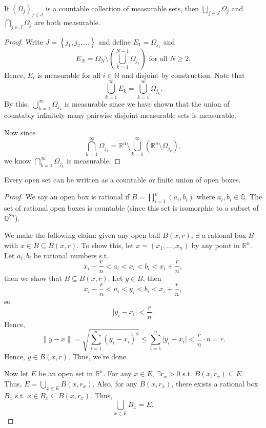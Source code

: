 \begin{lemma} \label{lm: sigma algebra property}
    If \((\Omega _j)_{j \in J}\) is a countable collection of measurable sets, then \(\bigcup_{j \in J} \Omega _j \) and \(\bigcap_{j \in J} \Omega _j \) are both measurable.   
\end{lemma}

\begin{proof}
    Write \(J = \left\{ j_1, j_2, \dots  \right\} \) and define \(E_1 = \Omega _{j_1}\) and
    \[
        E_N = \Omega _N \setminus \left( \bigcup_{k=1}^{N-1} \Omega _{j_k}  \right) \text{ for all } N \ge 2.  
    \]   
    Hence, \(E_i\) is measurable for all \(i \in \mathbb{N}\) and disjoint by construction. Note that 
    \[
        \bigcup_{k=1}^{\infty} E_k = \bigcup_{k=1}^{\infty} \Omega _{j_k}.  
    \]  
    By this, \(\bigcup_{k=1}^{\infty} \Omega _{j_k}\) is measurable since we have shown that the union of countably infinitely many pairwise disjoint measurable sets is measurable. 

    Now since 
    \[
        \bigcap_{k=1}^{\infty} \Omega _{j_k} = \mathbb{R} ^n \setminus \bigcup_{k=1}^{\infty} (\mathbb{R} ^n \setminus \Omega _{j_k}),  
    \] 
    we know \(\bigcap_{k=1}^{\infty} \Omega _{j_k}\) is measurable. 

\end{proof}

\begin{lemma} \label{lm: open set is countable union of open boxes}
    Every open set can be written as a countable or finite union of open boxes.
\end{lemma}

\begin{proof}
    We say an open box is rational if \(B = \prod _{i=1}^n (a_i, b_i)\) where \(a_i, b_i \in \mathbb{Q} \). The set of rational open boxes is countable (since this set is isomorphic to a subset of \(\mathbb{Q} ^{2n}\)). 

    We make the following claim: given any open ball \(B(x, r)\), \(\exists \) a rational box \(B\) with \(x \in B \subseteq B(x, r)\). To show this, let \(x = (x_1, \dots , x_n)\) by any point in \(\mathbb{R} ^n\). Let \(a_i, b_i\) be rational numbers s.t. 
    \[
        x_i - \frac{r}{n} < a_i < x_i < b_i < x_i + \frac{r}{n}, 
    \]        
    then we show that \(B \subseteq B(x, r)\). Let \(y \in B\), then 
    \[
        x_i - \frac{r}{n} < a_i < y_i < b_i < x_i + \frac{r}{n},
    \]  
    so 
    \[
        \vert y_i - x_i \vert < \frac{r}{n}.
    \]
    Hence,
    \[
        \lVert y - x \rVert = \sqrt{\sum_{i=1}^n (y_i - x_i)^2 } \le \sum_{i=1}^n \vert y_i - x_i \vert < \frac{r}{n} \cdot n = r.   
    \]
    Hence, \(y \in B(x, r)\). Thus, we're done. 

    Now let \(E\) be an open set in \(\mathbb{R} ^n\). For any \(x \in E\), \(\exists r_x > 0\) s.t. \(B(x, r_x) \subseteq E\). Thus, \(E = \bigcup_{x \in E} B(x, r_x) \). Also, for any \(B(x, r_x)\), there exists a rational box \(B_x\) s.t. \(x \in B_x \subseteq B(x, r_x)\). Thus,
    \[
        \bigcup_{x \in E} B_x = E. 
    \]          
\end{proof}

